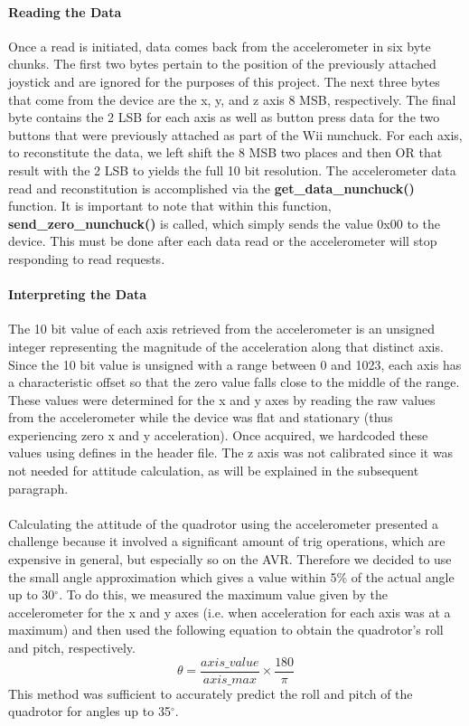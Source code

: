 \paragraph{Reading the Data}
Once a read is initiated, data comes back from the accelerometer in six byte chunks.  The first two bytes pertain to the position of the previously attached joystick and are ignored for the purposes of this project.  The next three bytes that come from the device are the x, y, and z axis 8 MSB, respectively.  The final byte contains the 2 LSB for each axis as well as button press data for the two buttons that were previously attached as part of the Wii nunchuck.  For each axis, to reconstitute the data, we left shift the 8 MSB two places and then OR that result with the 2 LSB to yields the full 10 bit resolution.  The accelerometer data read and reconstitution is accomplished via the {\bf get\_data\_nunchuck()} function.  It is important to note that within this function, {\bf send\_zero\_nunchuck()} is called, which simply sends the value 0x00 to the device.  This must be done after each data read or the accelerometer will stop responding to read requests.

\paragraph{Interpreting the Data}
The 10 bit value of each axis retrieved from the accelerometer is an unsigned integer representing the magnitude of the acceleration along that distinct axis.  Since the 10 bit value is unsigned with a range between 0 and 1023, each axis has a characteristic offset so that the zero value falls close to the middle of the range.  These values were determined for the x and y axes by reading the raw values from the accelerometer while the device was flat and stationary (thus experiencing zero x and y acceleration).  Once acquired, we hardcoded these values using defines in the header file.  The z axis was not calibrated since it was not needed for attitude calculation, as will be explained in the subsequent paragraph.

\paragraph{}
Calculating the attitude of the quadrotor using the accelerometer presented a challenge because it involved a significant amount of trig operations, which are expensive in general, but especially so on the AVR.  Therefore we decided to use the small angle approximation which gives a value within 5\% of the actual angle up to 30$^\circ$.  To do this, we measured the maximum value given by the accelerometer for the x and y axes (i.e. when acceleration for each axis was at a maximum) and then used the following equation to obtain the quadrotor's roll and pitch, respectively.
\begin{equation}
\theta = \frac{axis\_value}{axis\_max}\times\frac{180}{\pi}
\end{equation}
This method was sufficient to accurately predict the roll and pitch of the quadrotor for angles up to 35$^\circ$.
 
